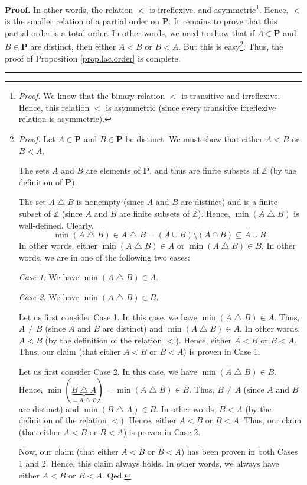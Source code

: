 \documentclass[numbers=enddot,12pt,final,onecolumn,notitlepage]{scrartcl}%
\theoremstyle{definition}
\newenvironment{proof}[1][Proof]{\noindent\textbf{#1.} }{\ \rule{0.5em}{0.5em}}
\newenvironment{verlong}{}{}
\begin{document}
\begin{verlong}
\begin{proof}
{In other words, the relation $<$ is irreflexive.} and
asymmetric\footnote{\textit{Proof.} We know that the binary relation $<$ is
transitive and irreflexive. Hence, this relation $<$ is asymmetric (since
every transitive irreflexive relation is asymmetric).}. Hence, $<$ is the
smaller relation of a partial order on $\mathbf{P}$. It remains to prove that
this partial order is a total order. In other words, we need to show that if
$A\in\mathbf{P}$ and $B\in\mathbf{P}$ are distinct, then either $A<B$ or
$B<A$. But this is easy\footnote{\textit{Proof.} Let $A\in\mathbf{P}$ and
$B\in\mathbf{P}$ be distinct. We must show that either $A<B$ or $B<A$.
\par
The sets $A$ and $B$ are elements of $\mathbf{P}$, and thus are finite subsets
of $\mathbb{Z}$ (by the definition of $\mathbf{P}$).
\par
The set $A\bigtriangleup B$ is nonempty (since $A$ and $B$ are distinct) and
is a finite subset of $\mathbb{Z}$ (since $A$ and $B$ are finite subsets of
$\mathbb{Z}$). Hence, $\min\left(  A\bigtriangleup B\right)  $ is
well-defined. Clearly,%
\[
\min\left(  A\bigtriangleup B\right)  \in A\bigtriangleup B=\left(  A\cup
B\right)  \setminus\left(  A\cap B\right)  \subseteq A\cup B.
\]
In other words, either $\min\left(  A\bigtriangleup B\right)  \in A$ or
$\min\left(  A\bigtriangleup B\right)  \in B$. In other words, we are in one
of the following two cases:
\par
\textit{Case 1:} We have $\min\left(  A\bigtriangleup B\right)  \in A$.
\par
\textit{Case 2:} We have $\min\left(  A\bigtriangleup B\right)  \in B$.
\par
Let us first consider Case 1. In this case, we have $\min\left(
A\bigtriangleup B\right)  \in A$. Thus, $A\neq B$ (since $A$ and $B$ are
distinct) and $\min\left(  A\bigtriangleup B\right)  \in A$. In other words,
$A<B$ (by the definition of the relation $<$). Hence, either $A<B$ or $B<A$.
Thus, our claim (that either $A<B$ or $B<A$) is proven in Case 1.
\par
Let us first consider Case 2. In this case, we have $\min\left(
A\bigtriangleup B\right)  \in B$. Hence, $\min\left(
\underbrace{B\bigtriangleup A}_{=A\bigtriangleup B}\right)  =\min\left(
A\bigtriangleup B\right)  \in B$. Thus, $B\neq A$ (since $A$ and $B$ are
distinct) and $\min\left(  B\bigtriangleup A\right)  \in B$. In other words,
$B<A$ (by the definition of the relation $<$). Hence, either $A<B$ or $B<A$.
Thus, our claim (that either $A<B$ or $B<A$) is proven in Case 2.
\par
Now, our claim (that either $A<B$ or $B<A$) has been proven in both Cases 1
and 2. Hence, this claim always holds. In other words, we always have either
$A<B$ or $B<A$. Qed.}. Thus, the proof of Proposition \ref{prop.lac.order} is complete.
\end{proof}
\end{verlong}
\end{document}
